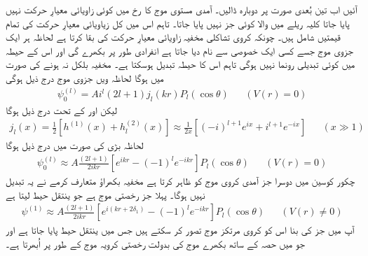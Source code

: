 آئیں اب تین بُعدی صورت پر دوبارہ ڈالیں۔ آمدی مستوی موج  کا  رخ میں کوئی زاویائی معیارِ حرکت نہیں پایا جاتا کلیہ ریلے میں  والا کوئی جز نہیں پایا جاتا۔ تاہم اس میں کل زیاویائی معیارِ حرکت  کی تمام قیمتیں شامل ہیں۔ چونکہ کروی تشاکلی مخفیہ زاویائی معیارِ حرکت کی بقا کرتا ہے لحاظہ ہر ایک جزوی موج جسے کسی ایک خصوصی  سے نام دیا جاتا ہے انفرادی طور پر بکھرے گی اور اس کے حیطہ میں کوئی تبدیلی رونما نہیں ہوگی تاہم اس کا حیطہ تبدیل ہوسکتا ہے۔ مخفیہ بلکل نہ ہونے کی صورت میں  ہوگا لحاظہ ویں جزوی موج درج ذیل ہوگی 
\begin{align}
	\psi_0^{(l)} = Ai^l(2l+1)j_l(kr)P_l(\cos\theta)&&(V(r)=0)
\end{align}
لیکن  اور  کے تحت درج ذیل ہوگا
\begin{align}
	j_l(x) = \frac{1}{2}\left[h^{(1)}(x)+h_l^{(2)}(x)\right]\approx\frac{1}{2x}\left[(-i)^{l+1}e^{ix}+i^{l+1}e^{-ix}\right]&&(x\gg1)
\end{align}
لحاظہ بڑی  کی صورت میں درج ذیل ہوگا
\begin{align}
	\psi_0^{(l)}\approx A\frac{(2l+1)}{2ikr}\left[e^{ikr}-(-1)^le^{-ikr}\right]P_l(\cos\theta)&&(V(r)=0)
\end{align}
چکور کوسین میں دوسرا جز آمدی کروی موج کو ظاہر کرتا ہے مخفیہ بکھراؤ متعارف کرمے نے یہ تبدیل نہیں ہوگا۔ پہلا جز رخصتی موج ہے جو ینتقل حیط  لیتا ہے
\begin{align}
	\psi^{(1)}\approx A\frac{(2l+1)}{2ikr}\left[e^{i(kr+2\delta_1)}-(-1)^le^{-ikr}\right]P_l(\cos\theta)&&(V(r)\neq0)
\end{align}
آپ  میں  جز کی بنا اس کو کروی مرتکز موج تصور کر سکتے ہیں جس میں  ینتقل حیط پایا جاتا ہے اور جو  میں  حصہ کے ساتھ بکھرے موج کی بدولت رخصتی کرویہ موج کے طور پر اُبھرتا ہے۔

